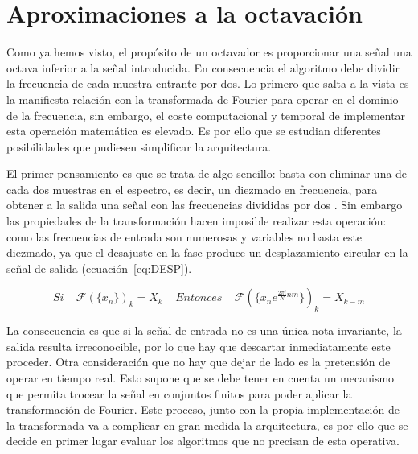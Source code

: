 \section{Aproximaciones a la octavación}
Como ya hemos visto, el propósito de un octavador es proporcionar una señal una octava inferior a la señal introducida. En consecuencia el algoritmo debe dividir la frecuencia de cada muestra entrante por dos. Lo primero que salta a la vista es la manifiesta relación con la transformada de Fourier para operar en el dominio de la frecuencia, sin embargo, el coste computacional y temporal de implementar esta operación matemática es elevado. Es por ello que se estudian diferentes posibilidades que pudiesen simplificar la arquitectura.

El primer pensamiento es que se trata de algo sencillo: basta con eliminar una de cada dos muestras en el espectro, es decir, un diezmado en frecuencia, para obtener a la salida una señal con las frecuencias divididas por dos \cite{Oppenheim}. Sin embargo las propiedades de la transformación hacen imposible realizar esta operación: como las frecuencias de entrada son numerosas y variables no basta este diezmado, ya que el desajuste en la fase produce un desplazamiento circular en la señal de salida (ecuación~\ref{eq:DESP}). 

\begin{equation}
\label{eq:DESP}
Si~~~~~\mathscr{F}(\{x_{n}\})_{k} = X_{k}~~~~~Entonces~~~~~\mathscr{F}(\{x_{n}e^{\frac{2\pi i}{N}nm}\})_{k}= X_{k-m} 
\end{equation}

La consecuencia es que si la señal de entrada no es una única nota invariante, la salida resulta irreconocible, por lo que  hay que descartar inmediatamente este proceder. Otra consideración que no hay que dejar de lado es la pretensión de operar en tiempo real. Esto supone que se debe tener en cuenta un mecanismo que permita trocear la señal en conjuntos finitos para poder aplicar la transformación de Fourier. Este proceso, junto con la propia implementación de la transformada va a complicar en gran medida la arquitectura, es por ello que se decide en primer lugar evaluar los algoritmos que no precisan de esta operativa.

